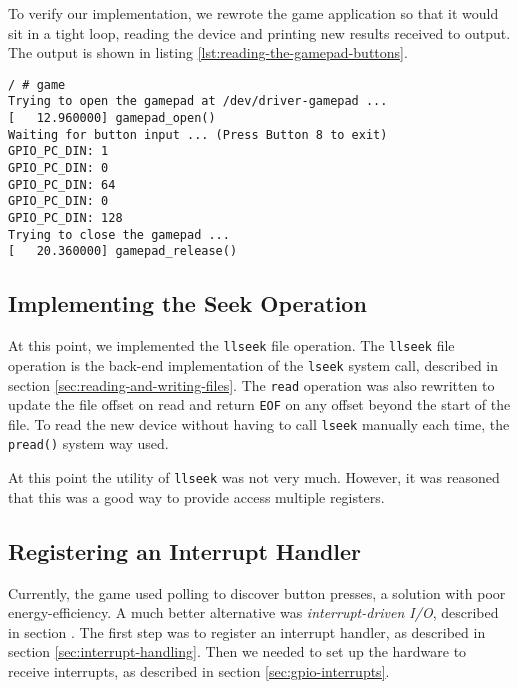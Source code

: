 To verify our implementation, we rewrote the game application so that it would sit in a tight loop, reading the device and printing new results received to output. The output is shown in listing \ref{lst:reading-the-gamepad-buttons}.
\begin{lstlisting}[caption=Reading the gamepad buttons,label=lst:reading-the-gamepad-buttons]
/ # game
Trying to open the gamepad at /dev/driver-gamepad ...
[   12.960000] gamepad_open()
Waiting for button input ... (Press Button 8 to exit)
GPIO_PC_DIN: 1
GPIO_PC_DIN: 0
GPIO_PC_DIN: 64
GPIO_PC_DIN: 0
GPIO_PC_DIN: 128
Trying to close the gamepad ...
[   20.360000] gamepad_release()
\end{lstlisting}

\subsection{Implementing the Seek Operation}
At this point, we implemented the \texttt{llseek} file operation. The \texttt{llseek} file operation is the back-end implementation of the \texttt{lseek} system call, described in section \ref{sec:reading-and-writing-files}. The \texttt{read} operation was also rewritten to update the file offset on read and return \texttt{EOF} on any offset beyond the start of the file. To read the new device without having to call \texttt{lseek} manually each time, the \texttt{pread()} system way used. 

At this point the utility of \texttt{llseek} was not very much. However, it was reasoned that this was a good way to provide access multiple registers.

\subsection{Registering an Interrupt Handler}
Currently, the game used polling to discover button presses, a solution with poor energy-efficiency. A much better alternative was \emph{interrupt-driven I/O}, described in section . The first step was to register an interrupt handler, as described in section \ref{sec:interrupt-handling}. Then we needed to set up the hardware to receive interrupts, as described in section \ref{sec:gpio-interrupts}.

